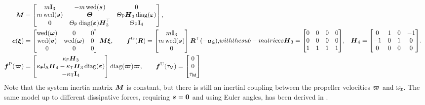\begin{subequations}
\begin{align}
 \sysInertiaMat &=
 \begin{bmatrix}
  \m \idMat[3] & -\m \wedOp(\bodyCOM{}{}) & 0 \\
  \m \wedOp(\bodyCOM{}{}) & \bodyMOI{}{}{} & \JP \mat{H}_3 \diag(\tuple{\PropDir})\\
  0 & \PropInertia \diag(\tuple{\PropDir}) \mat{H}_3^\top & \PropInertia \idMat[4] \\
 \end{bmatrix},
\\
 \gyroForce(\sysVel) &= 
 \begin{bmatrix} \wedOp(\w) & 0 & 0 \\ \wedOp(\v) & \wedOp(\w) & 0 \\ 0 & 0 & 0 \end{bmatrix}
 \sysInertiaMat \sysVel,
\qquad
 \genForceGravity(\R) = \begin{bmatrix} \m \idMat[3] \\ \m \wedOp(\bodyCOM{}{}) \\ 0 \end{bmatrix} \RT (-\gravityAcc),
\\
 \genForceProp(\tuple{\PropVel}) &= \begin{bmatrix} \kappaF \mat{H}_3 \\ \kappaF \ArmRadius \mat{H}_4 - \kappaT \mat{H}_3 \diag(\tuple{\PropDir})  \\ -\kappaT \idMat[4]  \end{bmatrix} \diag(\tuple{\PropVel}) \tuple{\PropVel},
\qquad
 \genForceInput(\BLDCTorque) = \begin{bmatrix} 0 \\ 0 \\ \BLDCTorque \end{bmatrix}
\end{align}
with the sub-matrices
\begin{align}
 \mat{H}_3 &= \begin{bmatrix}
  0 & 0 & 0 & 0 \\
  0 & 0 & 0 & 0 \\
  1 & 1 & 1 & 1
 \end{bmatrix}\!,&
 \mat{H}_4 &= \begin{bmatrix}
  0 & 1 & 0 & -1 \\
  -1 & 0 & 1 & 0 \\
  0 & 0 & 0 & 0
 \end{bmatrix}\!.
\end{align}
\end{subequations}
Note that the system inertia matrix $\boldsymbol{M}$ is constant, but there is still an inertial coupling between the propeller velocities $\boldsymbol{\varpi_{}}$ and $\omega_{\mathsf{z}}$.
The same model up to different dissipative forces, requiring $\bodyCOM{}{}{}=\tuple{0}$ and using Euler angles, has been derived in \cite{Martin:AccelerometerFeedback}.

